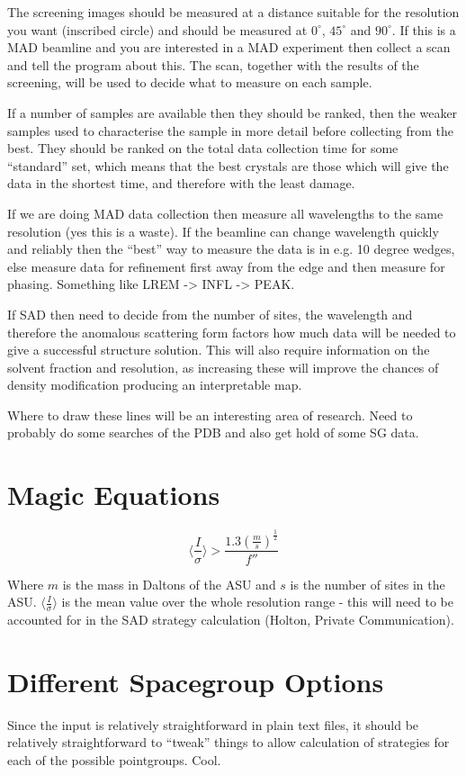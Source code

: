 \documentclass[a4paper, 11pt]{article}
\begin{document}
The screening images should be measured at a distance suitable for the 
resolution you want (inscribed circle) and should be measured at 
$0^{\circ}$, $45^{\circ}$ and $90^{\circ}$. If this is a MAD beamline and
you are interested in a MAD experiment then collect a scan and tell the 
program about this. The scan, together with the results of the screening,
will be used to decide what to measure on each sample.

If a number of samples are available then they should be ranked, then the
weaker samples used to characterise the sample in more detail before collecting
from the best. They should be ranked on the total data collection time for some
``standard'' set, which means that the best crystals are those which will 
give the data in the shortest time, and therefore with the least damage.

If we are doing MAD data collection then measure all wavelengths to the same
resolution (yes this is a waste). If the beamline can change wavelength 
quickly and reliably then the ``best'' way to measure the data is in e.g. 10
degree wedges, else measure data for refinement first away from the edge and
then measure for phasing. Something like LREM -> INFL -> PEAK. 

If SAD then need to decide from the number of sites, the wavelength and 
therefore the anomalous scattering form factors how much data will be needed
to give a successful structure solution. This will also require information
on the solvent fraction and resolution, as increasing these will improve the
chances of density modification producing an interpretable map.

Where to draw these lines will be an interesting area of research. Need to 
probably do some searches of the PDB and also get hold of some SG data.

\section{Magic Equations}

\begin{equation}
\langle \frac{I}{\sigma} \rangle > \frac{1.3 \left( \frac{m}{s} \right) 
^{\frac{1}{2}}}{f''}
\end{equation}

Where $m$ is the mass in Daltons of the ASU and $s$ is the number of sites
in the ASU. $\langle \frac{I}{\sigma} \rangle$ is the mean value over the
whole resolution range - this will need to be accounted for in the SAD strategy
calculation (Holton, Private Communication).

\section{Different Spacegroup Options}

Since the input is relatively straightforward in plain text files, it should be
relatively straightforward to ``tweak'' things to allow calculation of 
strategies for each of the possible pointgroups. Cool.
\end{document}

